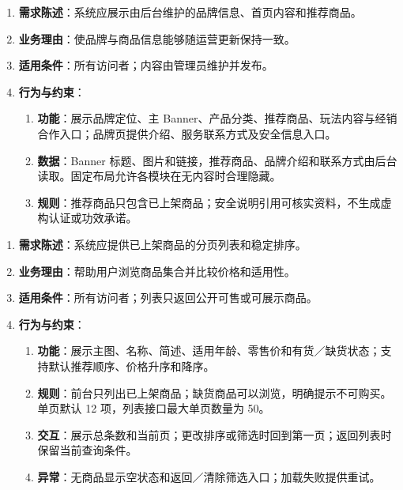 \begin{enumerate}
\item {\bfseries 需求陈述}：系统应展示由后台维护的品牌信息、首页内容和推荐商品。
\item {\bfseries 业务理由}：使品牌与商品信息能够随运营更新保持一致。
\item {\bfseries 适用条件}：所有访问者；内容由管理员维护并发布。
\item {\bfseries 行为与约束}：
\begin{enumerate}
\item {\bfseries 功能}：展示品牌定位、主 Banner、产品分类、推荐商品、玩法内容与经销合作入口；品牌页提供介绍、服务联系方式及安全信息入口。
\item {\bfseries 数据}：Banner 标题、图片和链接，推荐商品、品牌介绍和联系方式由后台读取。固定布局允许各模块在无内容时合理隐藏。
\item {\bfseries 规则}：推荐商品只包含已上架商品；安全说明引用可核实资料，不生成虚构认证或功效承诺。
\end{enumerate}

\end{enumerate}


\begin{enumerate}
\item {\bfseries 需求陈述}：系统应提供已上架商品的分页列表和稳定排序。
\item {\bfseries 业务理由}：帮助用户浏览商品集合并比较价格和适用性。
\item {\bfseries 适用条件}：所有访问者；列表只返回公开可售或可展示商品。
\item {\bfseries 行为与约束}：
\begin{enumerate}
\item {\bfseries 功能}：展示主图、名称、简述、适用年龄、零售价和有货／缺货状态；支持默认推荐顺序、价格升序和降序。
\item {\bfseries 规则}：前台只列出已上架商品；缺货商品可以浏览，明确提示不可购买。单页默认 12 项，列表接口最大单页数量为 50。
\item {\bfseries 交互}：展示总条数和当前页；更改排序或筛选时回到第一页；返回列表时保留当前查询条件。
\item {\bfseries 异常}：无商品显示空状态和返回／清除筛选入口；加载失败提供重试。
\end{enumerate}

\end{enumerate}

